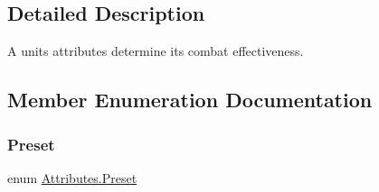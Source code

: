 \subsection{Detailed Description}
A unit\textquotesingle{}s attributes determine its combat effectiveness. 



\subsection{Member Enumeration Documentation}
\mbox{\label{class_attributes_a2dcc4757e5dd7b7d518f43f4f194d175}} 
\subsubsection{\texorpdfstring{Preset}{Preset}}
{\footnotesize\ttfamily enum \mbox{\hyperlink{class_attributes_a2dcc4757e5dd7b7d518f43f4f194d175}{Attributes.\+Preset}}\hspace{0.3cm}{\ttfamily [strong]}}

